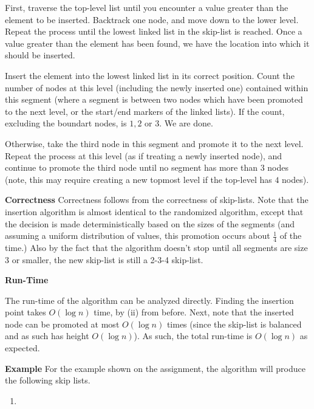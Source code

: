 \documentclass[12pt]{exam}
\newcommand*{\bigo}[1]{O\left( #1 \right)}
\begin{document}
\begin{questions}
\begin{parts}
\begin{solution}
First, traverse the top-level list until you encounter a value greater than the element to be inserted. Backtrack one node, and move down to the lower level. Repeat the process until the lowest linked list in the skip-list is reached. Once a value greater than the element has been found, we have the location into which it should be inserted.

Insert the element into the lowest linked list in its correct position. Count the number of nodes at this level (including the newly inserted one) contained within this segment (where a segment is between two nodes which have been promoted to the next level, or the start/end markers of the linked lists). If the count, excluding the boundart nodes, is $1, 2$ or $3$. We are done.

Otherwise, take the third node in this segment and promote it to the next level. Repeat the process at this level (as if treating a newly inserted node), and continue to promote the third node until no segment has more than $3$ nodes (note, this may require creating a new topmost level if the top-level has $4$ nodes).

\textbf{Correctness}
Correctness follows from the correctness of skip-lists. Note that the insertion algorithm is almost identical to the randomized algorithm, except that the decision is made deterministically based on the sizes of the segments (and assuming a uniform distribution of values, this promotion occurs about $\frac{1}{4}$ of the time.) Also by the fact that the algorithm doesn't stop until all segments are size $3$ or smaller, the new skip-list is still a 2-3-4 skip-list.

\textbf{Run-Time}

The run-time of the algorithm can be analyzed directly. Finding the insertion point takes $\bigo{\log n}$ time, by (ii) from before. Next, note that the inserted node can be promoted at most $\bigo{\log n }$ times (since the skip-list is balanced and as such has height $\bigo{\log n}$). As such, the total run-time is $\bigo{\log n}$ as expected.

\textbf{Example}
For the example shown on the assignment, the algorithm will produce the following skip lists.
\begin{enumerate}
  \item 
  \begin{center}
\end{center}
\end{enumerate}
\end{solution}
\end{parts}
\end{questions}
\end{document}
